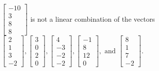\begin{exercise}
\begin{exerciseStatement}
  \end{exerciseStatement}
  \begin{exerciseAnswer}
   \(\left[\begin{array}{c}
-10 \\
3 \\
8 \\
8
\end{array}\right]\) 
  	 is not  
	a linear combination of the vectors \(\left[\begin{array}{c}
2 \\
1 \\
3 \\
-2
\end{array}\right] , \left[\begin{array}{c}
3 \\
0 \\
2 \\
0
\end{array}\right] , \left[\begin{array}{c}
4 \\
-3 \\
-2 \\
-2
\end{array}\right] , \left[\begin{array}{c}
-1 \\
8 \\
12 \\
0
\end{array}\right] , \text{ and } \left[\begin{array}{c}
8 \\
1 \\
7 \\
-2
\end{array}\right]\).

	
  


  \end{exerciseAnswer}
\end{exercise}